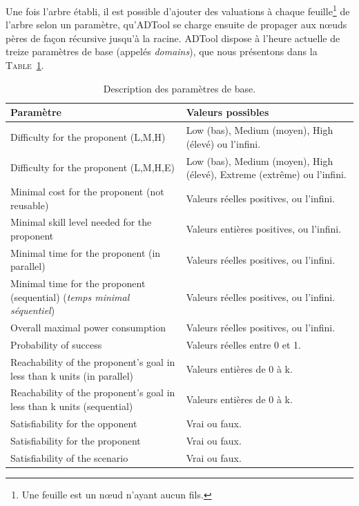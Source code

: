 	Une fois l'arbre établi, il est possible d'ajouter des valuations à chaque feuille\footnote{Une feuille est un nœud n'ayant aucun fils.} de l'arbre selon un paramètre, qu'ADTool se charge ensuite de propager aux nœuds pères de façon récursive jusqu'à la racine. ADTool dispose à l'heure actuelle de treize paramètres de base (appelés \textit{domains}), que nous présentons dans la \textsc{Table}~\ref{tab:DescriptionParam}.
					
	\begin{table}[h]
		\centering
		\begin{tabular}{|p{6cm}|p{5cm}|}
			\hline
			\textbf{Paramètre} & \textbf{Valeurs possibles} \\
			\hline
			Difficulty for the proponent (L,M,H) & 
				Low (bas), Medium (moyen), High (élevé) ou l'infini.\\ 
			\hline
			Difficulty for the proponent (L,M,H,E) & 
				Low (bas), Medium (moyen), High (élevé), Extreme (extrême) ou l'infini.\\ 
			\hline
			Minimal cost for the proponent (not reusable) & 
				Valeurs réelles positives, ou l'infini.\\ 
			\hline
			Minimal skill level needed for the proponent & 
				Valeurs entières positives, ou l'infini.\\ 
			\hline
			Minimal time for the proponent (in parallel) & 
				Valeurs réelles positives, ou l'infini.\\ 
			\hline
			Minimal time for the proponent (sequential) (\textit{temps minimal séquentiel}) & 
				Valeurs réelles positives, ou l'infini.\\ 
			\hline
			Overall maximal power consumption & 
				Valeurs réelles positives, ou l'infini.\\ 
			\hline
			Probability of success &
				Valeurs réelles entre 0 et 1.\\ 
			\hline
			Reachability of the proponent's goal in less than k units (in parallel) & 
				Valeurs entières de 0 à k. \\ 
			\hline
			Reachability of the proponent's goal in less than k units (sequential) & 
				Valeurs entières de 0 à k. \\ 
			\hline
			Satisfiability for the opponent & 
				Vrai ou faux. \\ 
			\hline
			Satisfiability for the proponent & 
				Vrai ou faux. \\ 
			\hline
			Satisfiability of the scenario & 
				Vrai ou faux. \\
			\hline
		\end{tabular}
		\caption{Description des paramètres de base.}
		\label{tab:DescriptionParam}
	\end{table}


